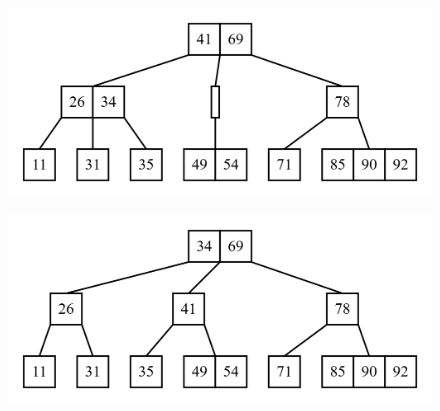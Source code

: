 \documentclass[11pt,a4paper]{article}
\begin{document}
\begin{loesung}
\begin{enumerate}
        \FloatBarrier   
        \begin{figure}[h!]
            \centering
            \includegraphics[height=0.22\textwidth]{img/b_tree_2.png}
        \end{figure}
        \FloatBarrier   
        \begin{figure}[h!]
            \centering
            \includegraphics[height=0.22\textwidth]{img/b_tree_3.png}
        \end{figure}
        \FloatBarrier   
    \end{enumerate}
\end{loesung}
\end{document}
